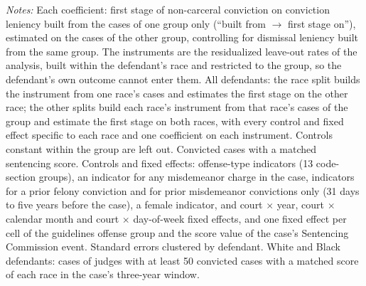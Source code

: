 \documentclass[11pt]{article}
\newcommand{\tabnote}[1]{\par\vspace{0.6ex}\begin{minipage}{\linewidth}\linespread{1}\footnotesize\textit{Notes:} #1\end{minipage}}
\newcommand{\controlsnote}{offense-type indicators (13 code-section groups), an indicator for any misdemeanor charge in the case, indicators for a prior felony conviction and for prior misdemeanor convictions only (31 days to five years before the case), a female indicator, and court $\times$ year, court $\times$ calendar month and court $\times$ day-of-week fixed effects}
\newcommand{\specnoteprim}{Convicted cases with a matched sentencing score. Controls and fixed effects: \controlsnote, and one fixed effect per cell of the guidelines offense group and the score value of the case's Sentencing Commission event. Standard errors clustered by defendant.}
\newcommand{\racesamplenote}{White and Black defendants: cases of judges with at least 50 convicted cases with a matched score of each race in the case's three-year window.}
\begin{document}
\begin{table}[H]
\centering
\caption{Split-sample monotonicity: first stages}\label{tab:mono_primary}

\tabnote{Each coefficient: first stage of non-carceral conviction on conviction leniency built from the cases of one group only (``built from $\rightarrow$ first stage on''), estimated on the cases of the other group, controlling for dismissal leniency built from the same group. The instruments are the residualized leave-out rates of the analysis, built within the defendant's race and restricted to the group, so the defendant's own outcome cannot enter them. All defendants: the race split builds the instrument from one race's cases and estimates the first stage on the other race; the other splits build each race's instrument from that race's cases of the group and estimate the first stage on both races, with every control and fixed effect specific to each race and one coefficient on each instrument. Controls constant within the group are left out. \specnoteprim{} \racesamplenote}
\end{table}
\end{document}

